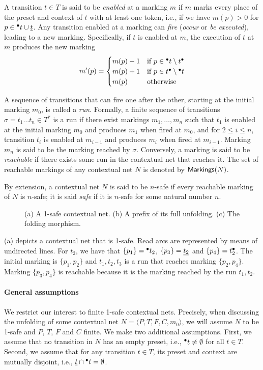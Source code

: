 \documentclass[11pt,a4paper]{article}
\begin{document}
A transition $t \in T$ is said to be \emph{enabled} at a marking $m$ if $m$
marks every place of the preset and context of $t$ with at least one token,
i.e.,  if we have $m(p) > 0$ for $p \in {}^\bullet t \cup \underline{t}$.  Any transition
enabled at a marking can \emph{fire} (\emph{occur} or \emph{be executed}),
leading to a new marking.  Specifically, if $t$ is enabled at $m$, the
execution of $t$ at $m$ produces the new marking $$m'(p) = 
\begin{cases}
m(p) - 1 & \mbox{if } p \in {}^\bullet t \setminus t^\bullet \\
m(p) + 1 & \mbox{if } p \in t^\bullet \setminus {}^\bullet t \\
m(p) & \mbox{otherwise}
\end{cases}$$

A sequence of transitions that can fire one after the other, starting at the
initial marking $m_0$, is called a \emph{run}.  Formally, a finite sequence of
transitions $\sigma = t_1 \ldots t_n \in T^*$ is a run if there exist markings
$m_1, \ldots, m_n$ such that $t_1$ is enabled at the initial marking $m_0$ and
produces $m_1$ when fired at $m_0$, and for $2 \le i \le n$, transition $t_i$
is enabled at $m_{i-1}$ and produces $m_i$ when fired at $m_{i-1}$.  Marking
$m_n$ is said to be the marking reached by $\sigma$.  Conversely, a marking is
said to be \emph{reachable} if there exists some run in the contextual net that
reaches it.  The set of reachable markings of any contextual net $N$ is denoted
by $\mathsf{ Markings }{(N)}$.

By extension, a contextual net $N$ is said to be $n$-safe if every reachable
marking of $N$ is $n$-safe; it is said \emph{safe} if it is $n$-safe for some
natural number $n$.

\begin{figure}
\caption{(a) A 1-safe contextual net. (b) A prefix of its full unfolding. (c)
The folding morphism.}
\label{fig:a.1safe}
\end{figure}

 (a) depicts a contextual net that is 1-safe.  Read arcs are
represented by means of undirected lines.  For $t_2$, we have that $\{p_1\} =
{}^\bullet t_2$, $\{p_3\} = \underline{t_2}$ and $\{p_4\} = t_2^\bullet$.  The initial
marking is $\{p_1, p_2\}$ and $t_1, t_2, t_3$ is a run that reaches marking
$\{p_2, p_4\}$.  Marking $\{p_3, p_4\}$ is reachable because it is the marking
reached by the run $t_1, t_2$.

\paragraph{General assumptions}  We restrict our interest to finite 1-safe
contextual nets.  Precisely, when discussing the unfolding of some contextual
net $N = \langle P, T, F, C, m_0 \rangle$, we will assume $N$ to be 1-safe and
$P$, $T$, $F$ and $C$ finite.  We make two additional assumptions.  First, we
assume that no transition in $N$ has an empty preset, i.e., ${}^\bullet t \ne
\emptyset$ for all $t \in T$.  Second, we assume that for any transition $t \in
T$, its preset and context are mutually disjoint, i.e., $\underline{t} \cap {}^\bullet t =
\emptyset$.
\end{document}
